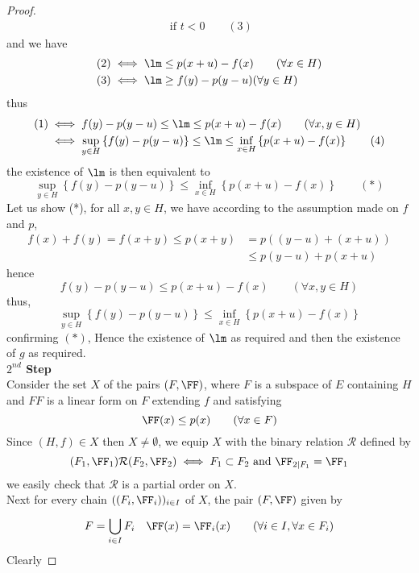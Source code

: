 \begin{theorem}
\begin{proof}
\[\begin{gathered}
		  \text{ if } t < 0 \quad  \quad (3)  
		 \end{gathered}
		 \]
		 and we have 
		 \begin{align*}
			 (2)  & \iff 
			 \lm \leq  p(x+u) - 
			 f(x)  \quad  \quad  (\forall  x \in  H)  \\
			 (3) & \iff 
			 \lm \geq  f(y)  - p(y-u)  ( \forall  y \in  H) 
		 \end{align*}
		 thus 
		 \begin{align*}
			 (1) & \iff 
			 f(y)  - p(y-u)  \leq 
			 \lm \leq 
			 p(x+u)  - f(x) \quad 
			 \quad  (\forall x,y \in H)  \\
			     & \iff 
			     \sup_{y \in  H}  
			     \left\{ f(y) - p(y-u)   \right\} 
			     \leq \lm \leq 
			     \inf_{x \in  H}  
			     \left\{ 
				     p(x+u)  - f(x) 
			     \right\} \quad \quad (4) 
		 \end{align*}
		 the existence of $\lm $  is then equivalent to 
		 \[
			 \sup_{y \in  H}  
			 \left\{ 
				 f(y)  - p(y-u) 
			 \right\} \leq 
			 \inf_{ x \in  H}  
			 \left\{ p(x+u) - f(x)   \right\} \quad  
			 \quad  (*) 
		 \]
		 Let us show (*), for all $x, y \in H $,
		 we have according to the assumption made on $f $ and
		 $p $, 
		 \begin{align*}
		 f(x) + f(y) = f(x+y)  \leq 
		 p(x+y)  &=  p((y-u) + (x+u)  )  \\
			 & \leq 
			 p(y-u)  + p(x+u) 
		 \end{align*}
		 hence 
		 \[
		 f(y)  - p(y-u)  \leq 
		 p(x+u)  - f(x)  \quad 
		 \quad  (\forall  x,y \in  H) 
		 \]
		 thus, 
		 \[
		 \sup_{y \in  H}  \left\{ 
			 f(y)  - 
			 p(y-u) 
		 \right\} \leq 
		 \inf_{x \in  H}  
		 \left\{ 
			 p(x+u)  - f(x) 
		 \right\}
		 \]
		 confirming $(*)$, Hence the existence of 
		 $\lm $  as required and then the existence of 
		 $g $ as required.
		 \\
		 \textbf{ $2^{nd} $ Step }
		 \\
		 Consider the set $X $ of the pairs 
		 $(F, \FF  )  $,  where $F $ is a subspace of 
		 $E $ containing $H $ and $FF $  is a linear 
		 form on $F $ extending $f $ and satisfying 
		 \[
		 \FF (x)  \leq  p(x) \quad  \quad  (\forall  x \in  F)    
		 \] 
		 Since $(H,f) \in  X  $  then 
		 $X \neq  \emptyset  $, 
		 we equip $X $ with the binary relation $\mathcal{R}$ 
		 defined by 
		 \[
			 (F_1, \FF _{1})   
			 \mathcal{R}  
			 (F_2, \FF _{2})  
			 \iff  F_1 \subset F_2 \text{ and }  
			 \FF_{2|F_{1}} = \FF _{1}
		 \]
		 we easily check that 
		 $ \mathcal{R}  $  is a partial order on $X $.
		 \\
		 Next for every chain $((F_{i}, \FF_{i} ) )_{i \in  I}  $  
		 of $X $, the pair $(F, \FF )  $ given by 
		 \[
		 F = \bigcup_{i \in  I}^{}  
		 F_{i} \quad  
		 \FF (x)  = \FF _{i} (x)  \quad 
		 \quad 
		 (\forall  i \in  I, \forall  x \in  F_{i}) 
		 \]
		 Clearly 



\end{proof}
\end{theorem}

